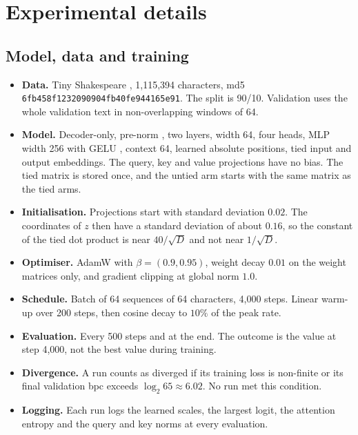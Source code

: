 \documentclass[11pt]{article}
\begin{document}
\section{Experimental details}\label{app:setup}

\subsection{Model, data and training}

\begin{itemize}
\item \textbf{Data.} Tiny Shakespeare \citep{karpathy2015}, 1,115,394 characters, md5 \texttt{6fb458f1232090904f\allowbreak b40fe944165e91}. The split is 90/10. Validation uses the whole validation text in non-overlapping windows of 64.
\item \textbf{Model.} Decoder-only, pre-norm \citep{ba2016}, two layers, width 64, four heads, MLP width 256 with GELU \citep{hendrycks2016}, context 64, learned absolute positions, tied input and output embeddings. The query, key and value projections have no bias. The tied matrix is stored once, and the untied arm starts with the same matrix as the tied arms.
\item \textbf{Initialisation.} Projections start with standard deviation $0.02$. The coordinates of $z$ then have a standard deviation of about $0.16$, so the constant of the tied dot product is near $40/\sqrt D$ and not near $1/\sqrt D$.
\item \textbf{Optimiser.} AdamW \citep{loshchilov2019adamw} with $\beta=(0.9,0.95)$, weight decay $0.01$ on the weight matrices only, and gradient clipping \citep{pascanu2013} at global norm $1.0$.
\item \textbf{Schedule.} Batch of 64 sequences of 64 characters, 4,000 steps. Linear warm-up over 200 steps, then cosine decay \citep{loshchilov2017sgdr} to $10\%$ of the peak rate.
\item \textbf{Evaluation.} Every 500 steps and at the end. The outcome is the value at step 4,000, not the best value during training.
\item \textbf{Divergence.} A run counts as diverged if its training loss is non-finite or its final validation bpc exceeds $\log_2 65\approx6.02$. No run met this condition.
\item \textbf{Logging.} Each run logs the learned scales, the largest logit, the attention entropy and the query and key norms at every evaluation.
\end{itemize}
\end{document}
